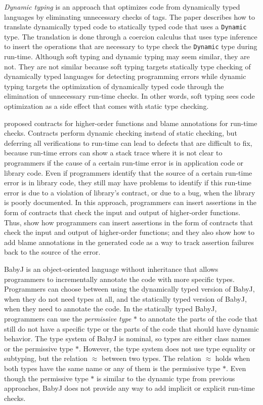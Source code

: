 \documentclass[preprint]{sig-alternate}
\begin{document}
\textit{Dynamic typing} \citep{henglein1994dts} is an approach
that optimizes code from dynamically typed languages by eliminating
unnecessary checks of tags.
The paper describes how to translate dynamically typed code to
statically typed code that uses a \texttt{Dynamic} type.
The translation is done through a coercion calculus that uses type
inference to insert the operations that are necessary to type check
the \texttt{Dynamic} type during run-time.
Although soft typing and dynamic typing may seem similar, they are not.
They are not similar because soft typing targets statically type
checking of dynamically typed languages for detecting programming
errors while dynamic typing targets the optimization of dynamically
typed code through the elimination of unnecessary run-time checks.
In other words, soft typing sees code optimization as a side effect
that comes with static type checking.

\citet{findler2002chf} proposed contracts for higher-order functions
and blame annotations for run-time checks.
Contracts perform dynamic checking instead of static checking,
but deferring all verifications to run-time can lead to defects
that are difficult to fix, because run-time errors can show a
stack trace where it is not clear to programmers if the cause of a
certain run-time error is in application code or library code.
Even if programmers identify that the source of a certain run-time
error is in library code, they still may have problems to identify
if this run-time error is due to a violation of library's contract,
or due to a bug, when the library is poorly documented.
In this approach, programmers can insert assertions in the form of
contracts that check the input and output of higher-order functions.
Thus, \citet{findler2002chf} show how programmers can insert
assertions in the form of contracts that check the input and output
of higher-order functions; and they also show how to add blame
annotations in the generated code as a way to track assertion
failures back to the source of the error.

BabyJ \citep{anderson2003babyj} is an object-oriented language
without inheritance that allows programmers to incrementally annotate
the code with more specific types.
Programmers can choose between using the dynamically typed version
of BabyJ, when they do not need types at all, and the statically
typed version of BabyJ, when they need to annotate the code.
In the statically typed BabyJ, programmers can use the
\textit{permissive type} $*$ to annotate the parts of the code that
still do not have a specific type or the parts of the code that should
have dynamic behavior.
The type system of BabyJ is nominal, so types are either class names
or the permissive type $*$.
However, the type system does not use type equality or subtyping,
but the relation $\approx$ between two types.
The relation $\approx$ holds when both types have the same name or
any of them is the permissive type $*$.
Even though the permissive type $*$ is similar to the dynamic type
from previous approaches, BabyJ does not provide any way to add
implicit or explicit run-time checks.
\end{document}
